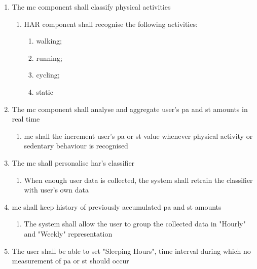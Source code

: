     \begin{enumerate}
        \item The \gls{mc} component shall classify physical activities
        \begin{enumerate}
            \item HAR component shall recognise the following activities:
            \begin{enumerate}
                \item walking;
                \item running;
                \item cycling;
                \item static
            \end{enumerate}
        \end{enumerate}
        \item The \gls{mc} component shall analyse and aggregate user's \gls{pa} and \gls{st} amounts in real time
            \begin{enumerate}
                \item \gls{mc} shall the increment user's \gls{pa} or \gls{st} value whenever physical activity or sedentary behaviour is recognised
            \end{enumerate}
        \item The \gls{mc} shall personalise \gls{har}'s classifier
            \begin{enumerate}
                \item When enough user data is collected, the system shall retrain the classifier with user's own data
            \end{enumerate}
            
        \item \gls{mc} shall keep history of previously accumulated \gls{pa} and \gls{st} amounts
            \begin{enumerate}
                \item The system shall allow the user to group the collected data in "Hourly" and "Weekly" representation
            \end{enumerate}
        
        \item The user shall be able to set "Sleeping Hours", time interval during which no measurement of \gls{pa} or \gls{st} should occur
      
    \end{enumerate}
    

